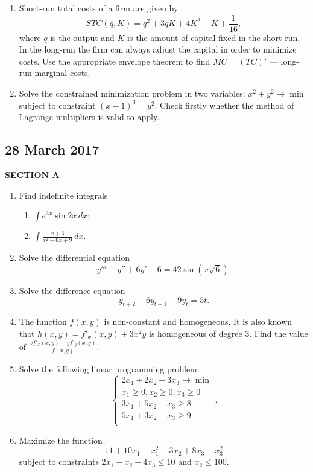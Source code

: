 \begin{enumerate}[resume]
\item Short-run total costs of a firm are given by
\[
STC(q,K) = {q^2} + 3qK + 4{K^2} - K + \frac{1}{{16}},
\]
where  $q$ is the output and $K$ is the amount of capital fixed in the short-run. In the long-run the firm can always adjust the capital in order to minimize costs. Use the appropriate envelope theorem to find $MC = (TC)'$ — long-run marginal costs.

\item Solve the constrained minimization problem in two variables: $x^2 + y^2 \to \min$ subject to constraint $(x - 1)^3 = y^2$. Check firstly whether the method of Lagrange multipliers is valid to apply.


\end{enumerate}



\subsection{28 March 2017}

\textbf{SECTION A}

\begin{enumerate}

\item Find indefinite integrals
\begin{enumerate}
  \item  $\int {{e^{3x}}\sin 2x \, dx}$;
  \item  $\int {\frac{{x + 3}}{{{x^2} - 6x + 9}} \, dx}$.
\end{enumerate}

\item Solve the differential equation
\[
y''' - y'' + 6y' - 6 = 42\sin (x\sqrt 6 ).
\]

\item Solve the difference equation
\[
{y_{t + 2}} - 6{y_{t + 1}} + 9{y_t} = 5t.
\]

\item The function $f(x, y)$ is non-constant and homogeneous. It is also known that $h(x, y) = f'_x(x, y) + 3x^2y$ is homogeneous of degree 3. Find the value of $\frac{xf'_x(x, y) + yf'_y(x, y)}{f(x, y)}$.

\item Solve the following linear programming problem:
\[
\begin{cases}
2x_1 + 2x_2 + 3x_3 \to \min \\
x_1 \geq 0, x_2 \geq 0, x_3 \geq 0 \\
3x_1 + 5x_2 + x_3 \geq 8 \\
5x_1 + 3x_2 + x_3 \geq 9 \\
\end{cases}.
\]

\item Maximize the function
\[
11 + 10x_1 - x_1^2 -3x_2 + 8x_3 - x_3^2
\]
subject to constraints $2x_1 -x_2+4x_3 \leq 10$ and $x_2 \leq 100$.

\end{enumerate}

